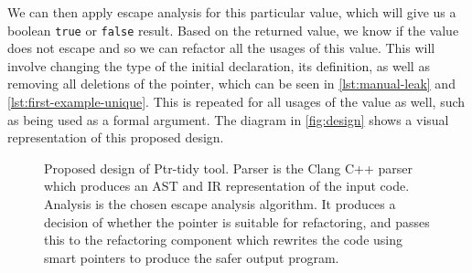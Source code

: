 \documentclass{proposal}
\begin{document}
    We can then apply escape analysis for this particular value, which will give us a boolean \texttt{true} or \texttt{false} result.
    Based on the returned value, we know if the value does not escape and so we can refactor all the usages of this value.
    This will involve changing the type of the initial declaration, its definition, as well as removing all deletions of the pointer, which can be seen in \autoref{lst:manual-leak} and \autoref{lst:first-example-unique}.
    This is repeated for all usages of the value as well, such as being used as a formal argument.
    The diagram in \autoref{fig:design} shows a visual representation of this proposed design.

    \begin{figure}
        \centering
        \caption{Proposed design of Ptr-tidy tool. Parser is the Clang C++ parser which produces an AST and IR representation of the input code. Analysis is the chosen escape analysis algorithm. It produces a decision of whether the pointer is suitable for refactoring, and passes this to the refactoring component which rewrites the code using smart pointers to produce the safer output program.}
        \label{fig:design}
    \end{figure}
\end{document}
